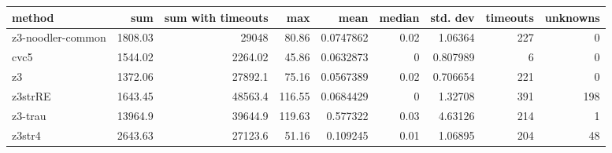 \begin{tabular}{lrrrrrrrr}
\hline
 method            &      sum &   sum with timeouts &    max &      mean &   median &   std. dev &   timeouts &   unknowns \\
\hline
 z3-noodler-common &  1808.03 &            29048    &  80.86 & 0.0747862 &     0.02 &   1.06364  &        227 &          0 \\
 cvc5              &  1544.02 &             2264.02 &  45.86 & 0.0632873 &     0    &   0.807989 &          6 &          0 \\
 z3                &  1372.06 &            27892.1  &  75.16 & 0.0567389 &     0.02 &   0.706654 &        221 &          0 \\
 z3strRE           &  1643.45 &            48563.4  & 116.55 & 0.0684429 &     0    &   1.32708  &        391 &        198 \\
 z3-trau           & 13964.9  &            39644.9  & 119.63 & 0.577322  &     0.03 &   4.63126  &        214 &          1 \\
 z3str4            &  2643.63 &            27123.6  &  51.16 & 0.109245  &     0.01 &   1.06895  &        204 &         48 \\
\hline
\end{tabular}

